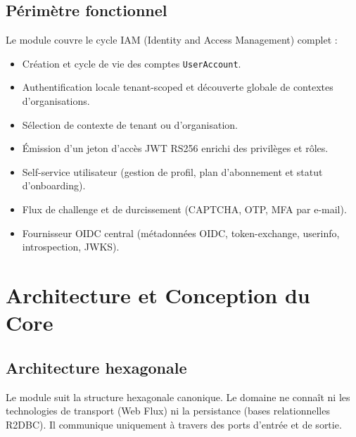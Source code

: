 \documentclass[
]{IPLeiriaThesis}
\newcommand{\code}[1]{\texttt{\small #1}}
\begin{document}
\section{Périmètre fonctionnel}
Le module couvre le cycle IAM (Identity and Access Management) complet :
\begin{itemize}
  \item Création et cycle de vie des comptes \code{UserAccount}.
  \item Authentification locale tenant-scoped et découverte globale de contextes d'organisations.
  \item Sélection de contexte de tenant ou d'organisation.
  \item Émission d'un jeton d'accès JWT RS256 enrichi des privilèges et rôles.
  \item Self-service utilisateur (gestion de profil, plan d'abonnement et statut d'onboarding).
  \item Flux de challenge et de durcissement (CAPTCHA, OTP, MFA par e-mail).
  \item Fournisseur OIDC central (métadonnées OIDC, token-exchange, userinfo, introspection, JWKS).
\end{itemize}

\chapter{Architecture et Conception du Core}

\section{Architecture hexagonale}
Le module suit la structure hexagonale canonique. Le domaine ne connaît ni les technologies de transport (Web Flux) ni la persistance (bases relationnelles R2DBC). Il communique uniquement à travers des ports d'entrée et de sortie.
\end{document}
